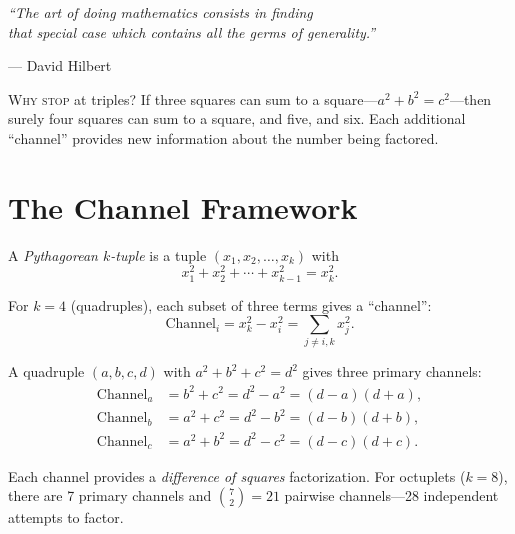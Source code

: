 \documentclass[11pt,twoside,openright]{book}
\theoremstyle{definition}
\begin{document}
\epigraph{\itshape ``The art of doing mathematics consists in finding\\
that special case which contains all the germs of generality.''}
{--- David Hilbert}

\lettrine[lines=3]{W}{hy stop} at triples? If three squares can sum
to a square---$a^2 + b^2 = c^2$---then surely four squares can sum to a
square, and five, and six. Each additional ``channel'' provides new
information about the number being factored.

\section{The Channel Framework}

A \emph{Pythagorean $k$-tuple} is a tuple $(x_1, x_2, \ldots, x_k)$ with
\[
x_1^2 + x_2^2 + \cdots + x_{k-1}^2 = x_k^2.
\]

For $k = 4$ (quadruples), each subset of three terms gives a ``channel'':
\[
\text{Channel}_i = x_k^2 - x_i^2 = \sum_{j \neq i, k} x_j^2.
\]

A quadruple $(a,b,c,d)$ with $a^2 + b^2 + c^2 = d^2$ gives three
primary channels:
\begin{align*}
\text{Channel}_a &= b^2 + c^2 = d^2 - a^2 = (d-a)(d+a),\\
\text{Channel}_b &= a^2 + c^2 = d^2 - b^2 = (d-b)(d+b),\\
\text{Channel}_c &= a^2 + b^2 = d^2 - c^2 = (d-c)(d+c).
\end{align*}

Each channel provides a \emph{difference of squares} factorization.
For octuplets ($k = 8$), there are 7 primary channels and
$\binom{7}{2} = 21$ pairwise channels---28 independent attempts
to factor.

\begin{center}
\end{center}
\end{document}
